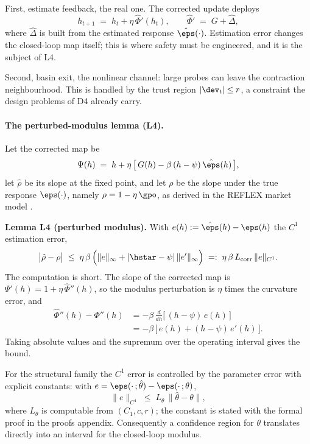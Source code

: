 First, estimate feedback, the real one. The corrected update deploys
\begin{equation*}
h_{t+1} \;=\; h_t + \eta\,\hat\Phi'(h_t),
\qquad
\hat\Phi' \;=\; G + \hat\Delta ,
\end{equation*}
where $\hat\Delta$ is built from the estimated response
$\hat\eps(\cdot)$. Estimation error changes the closed-loop map itself;
this is where safety must be engineered, and it is the subject of L4.

Second, basin exit, the nonlinear channel: large probes can leave the
contraction neighbourhood. This is handled by the trust region
$|\dev_t| \le r$, a constraint the design problems of D4 already carry.

\paragraph{The perturbed-modulus lemma (L4).}
Let the corrected map be
\begin{equation*}
\Psi(h) \;=\; h + \eta\,\big[\,G(h) - \beta\,(h-\psi)\,\hat\eps(h)\,\big],
\end{equation*}
let $\hat\rho$ be its slope at the fixed point, and let $\rho$ be the
slope under the true response $\eps(\cdot)$, namely
$\rho = 1 - \eta\,\gpo$, as derived in the REFLEX market model \citep{reflex2026}.

\textbf{Lemma L4 (perturbed modulus).} With
$e(h) := \hat\eps(h) - \eps(h)$ the $C^1$ estimation error,
\begin{equation*}
\big|\hat\rho - \rho\big|
\;\le\;
\eta\,\beta\,\Big( \|e\|_\infty + |\hstar - \psi|\,\|e'\|_\infty \Big)
\;=:\;
\eta\,\beta\,L_{\mathrm{corr}}\,\|e\|_{C^1} .
\end{equation*}
The computation is short. The slope of the corrected map is
$\Psi'(h) = 1 + \eta\,\hat\Phi''(h)$, so the modulus perturbation is
$\eta$ times the curvature error, and
\begin{align*}
\hat\Phi''(h) - \Phi''(h)
&= -\beta\,\frac{d}{dh}\Big[\,(h-\psi)\,e(h)\,\Big] \\
&= -\beta\,\Big[\, e(h) + (h-\psi)\,e'(h) \,\Big].
\end{align*}
Taking absolute values and the supremum over the operating interval gives
the bound.

For the structural family the $C^1$ error is controlled by the parameter
error with explicit constants: with
$e = \eps(\cdot\,;\hat\theta) - \eps(\cdot\,;\theta)$,
\begin{equation*}
\|e\|_{C^1} \;\le\; L_\theta\,\|\hat\theta - \theta\| ,
\end{equation*}
where $L_\theta$ is computable from $(C_1, c, r)$; the constant is stated
with the formal proof in the proofs appendix. Consequently a confidence
region for $\theta$ translates directly into an interval for the
closed-loop modulus.

